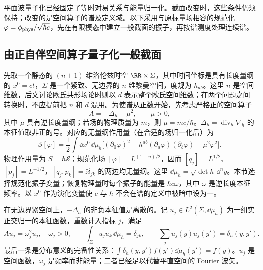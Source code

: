 平面波量子化已经固定了等时对易关系与能量归一化。截面改变时，这些条件仍须保持；改变的是空间算子的谱及定义域。以下采用与原标量场相容的规范化 $\varphi=\phi_{\rm phys}/\sqrt{\hbar c}$，先在有限模态中建立一般截面的振子，再按谱测度处理连续谱。

\subsection{由正自伴空间算子量子化一般截面}
\label{subsec:ghs-mode-quantization}


先取一个静态的 $(n+1)$ 维洛伦兹时空 $\RR\times\Sigma$，其中时间坐标是具有长度量纲的 $x^0=ct$，$\Sigma$ 是一个紧致、无边界的 $n$ 维黎曼空间，度规为 $h_{ab}$。这里 $n$ 是空间维数，后文讨论欧氏共形场论时则以 $d$ 表示整个欧氏空间维数；在两个问题之间转换时，不应提前把 $n$ 和 $d$ 混用。为使谱从正数开始，先考虑严格正的空间算子
\begin{equation}\label{eq:ghs-bridge-spatial-A}
 A=-\Delta_h+\mu^2,\qquad \mu>0,
\end{equation}
其中 $\mu$ 具有逆长度量纲；若场的物理质量为 $m$，则 $\mu=mc/\hbar$。$\Delta_h=\operatorname{div}_h\nabla_h$ 的本征值取非正的号。对应的无量纲作用量（在合适的场归一化后）为
\begin{equation}\label{eq:ghs-bridge-lorentz-action}
 \mathscr S[\varphi]=\frac12\int\dd x^0\,\dd\mu_h
 \bigl[(\partial_0\varphi)^2-h^{ab}(\partial_a\varphi)(\partial_b\varphi)-\mu^2\varphi^2\bigr].
\end{equation}
物理作用量为 $S=\hbar\mathscr S$；规范化场 $[\varphi]=L^{(1-n)/2}$，因而 $[q_j]=L^{1/2}$、$[p_j]=L^{-1/2}$，$[q_j,p_k]=\ii\delta_{jk}$ 的两边均无量纲。这里 $\dd\mu_h=\sqrt{\det h}\,\dd^ny$。本节选择规范化振子变量；恢复物理量时每个振子的能量是 $\hbar c\omega$，其中 $\omega$ 是逆长度本征频率。以 $x^0$ 作为演化变量使 $c$ 与 $\hbar$ 不会在谱的定义中被暗中设为一。

在无边界紧空间上，$-\Delta_h$ 的非负本征值是离散的。记 $u_j\in L^2(\Sigma,\dd\mu_h)$ 为一组实正交归一的本征函数，重数计入指标 $j$，满足
\begin{equation}\label{eq:ghs-bridge-eigenbasis}
 Au_j=\omega_j^2u_j,\quad \omega_j>0,\qquad
 \int_\Sigma u_j u_k\,\dd\mu_h=\delta_{jk},\qquad
 \sum_j u_j(y)u_j(y')=\delta_h(y,y').
\end{equation}
最后一条是分布意义的完备性关系：$\int\delta_h(y,y')f(y')\dd\mu_h(y')=f(y)$。$u_j$ 是空间函数，$\omega_j$ 是频率而非能量；二者已经足以代替平直空间的 Fourier 波矢。

